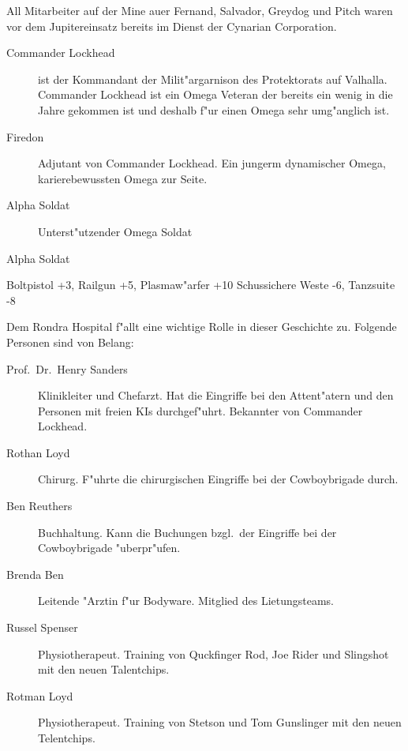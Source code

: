 All Mitarbeiter auf der Mine au\3er Fernand, Salvador, Greydog und Pitch waren vor dem Jupitereinsatz bereits im Dienst der Cynarian Corporation.



\begin{description}
    \item[Commander Lockhead] ist der Kommandant der Milit"argarnison des Protektorats auf Valhalla. Commander Lockhead ist ein Omega Veteran der bereits ein wenig in die Jahre gekommen ist und deshalb f"ur einen Omega sehr umg"anglich ist. 
    \item[Firedon] Adjutant von Commander Lockhead. Ein jungerm dynamischer Omega, karierebewussten Omega zur Seite.
    \item[Alpha Soldat] Unterst"utzender Omega Soldat
\end{description}

\begin{nscsheet}{Alpha Soldat}
    \nscstats[ATT=7,AGG=7,EMP=4,KNO=3,HP=13]
    \nscruler
    \begin{nscinventory}
        \nscitem[Waffen] Boltpistol +3, Railgun +5, Plasmaw"arfer +10
        \nscitem[R"ustung] Schussichere Weste -6, Tanzsuite -8
    \end{nscinventory}
\end{nscsheet}



Dem Rondra Hospital f"allt eine wichtige Rolle in dieser Geschichte zu. Folgende Personen sind von Belang:

\begin{description}
    \item[Prof.~Dr.~Henry Sanders] Klinikleiter und Chefarzt. Hat die Eingriffe bei den Attent"atern und den Personen mit freien KIs durchgef"uhrt. Bekannter von Commander Lockhead.
    \item[Rothan Loyd] Chirurg. F"uhrte die chirurgischen Eingriffe bei der Cowboybrigade durch.
    \item[Ben Reuthers] Buchhaltung. Kann die Buchungen bzgl.~der Eingriffe bei der Cowboybrigade "uberpr"ufen.
    \item[Brenda Ben] Leitende "Arztin f"ur Bodyware. Mitglied des Lietungsteams.
    \item[Russel Spenser] Physiotherapeut. Training von Quckfinger Rod, Joe Rider und Slingshot mit den neuen Talentchips.
    \item[Rotman Loyd] Physiotherapeut. Training von Stetson und Tom Gunslinger mit den neuen Telentchips.    
\end{description}

